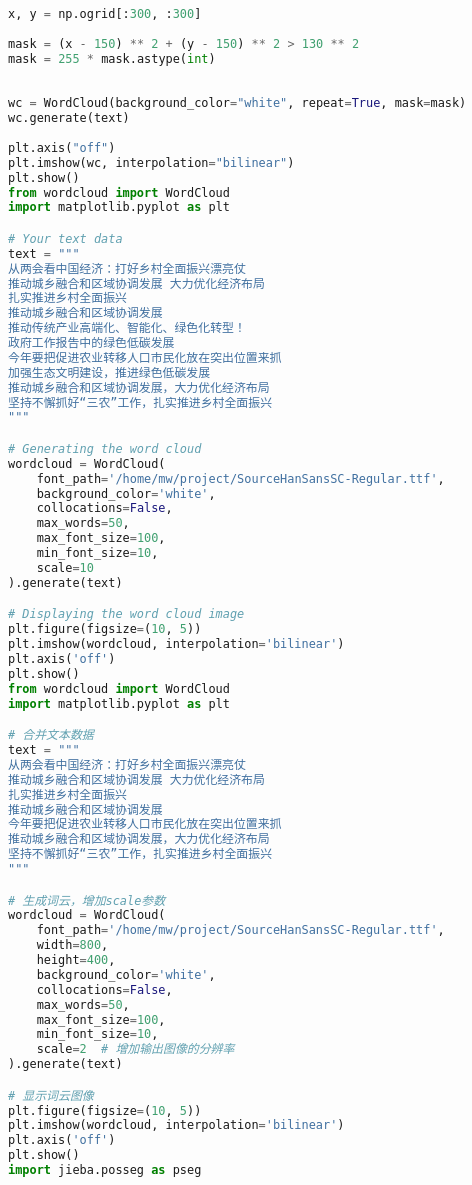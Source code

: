 \begin{lstlisting}[language=python,caption={两会数据爬虫}]
x, y = np.ogrid[:300, :300]
 
mask = (x - 150) ** 2 + (y - 150) ** 2 > 130 ** 2
mask = 255 * mask.astype(int)
 
 
wc = WordCloud(background_color="white", repeat=True, mask=mask)
wc.generate(text)
 
plt.axis("off")
plt.imshow(wc, interpolation="bilinear")
plt.show()
from wordcloud import WordCloud
import matplotlib.pyplot as plt

# Your text data
text = """
从两会看中国经济：打好乡村全面振兴漂亮仗
推动城乡融合和区域协调发展 大力优化经济布局
扎实推进乡村全面振兴
推动城乡融合和区域协调发展
推动传统产业高端化、智能化、绿色化转型！
政府工作报告中的绿色低碳发展
今年要把促进农业转移人口市民化放在突出位置来抓
加强生态文明建设，推进绿色低碳发展
推动城乡融合和区域协调发展，大力优化经济布局
坚持不懈抓好“三农”工作，扎实推进乡村全面振兴
"""

# Generating the word cloud
wordcloud = WordCloud(
    font_path='/home/mw/project/SourceHanSansSC-Regular.ttf',
    background_color='white',
    collocations=False,
    max_words=50,
    max_font_size=100,
    min_font_size=10,
    scale=10
).generate(text)

# Displaying the word cloud image
plt.figure(figsize=(10, 5))
plt.imshow(wordcloud, interpolation='bilinear')
plt.axis('off')
plt.show()
from wordcloud import WordCloud
import matplotlib.pyplot as plt

# 合并文本数据
text = """
从两会看中国经济：打好乡村全面振兴漂亮仗
推动城乡融合和区域协调发展 大力优化经济布局
扎实推进乡村全面振兴
推动城乡融合和区域协调发展
今年要把促进农业转移人口市民化放在突出位置来抓
推动城乡融合和区域协调发展，大力优化经济布局
坚持不懈抓好“三农”工作，扎实推进乡村全面振兴
"""

# 生成词云，增加scale参数
wordcloud = WordCloud(
    font_path='/home/mw/project/SourceHanSansSC-Regular.ttf',
    width=800,
    height=400,
    background_color='white',
    collocations=False,
    max_words=50,
    max_font_size=100,
    min_font_size=10,
    scale=2  # 增加输出图像的分辨率
).generate(text)

# 显示词云图像
plt.figure(figsize=(10, 5))
plt.imshow(wordcloud, interpolation='bilinear')
plt.axis('off')
plt.show()
import jieba.posseg as pseg
\end{lstlisting}
